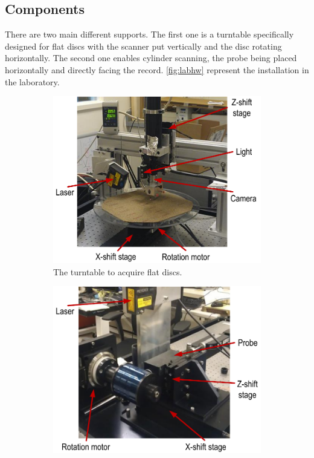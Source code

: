 \subsection{Components}

There are two main different supports. The first one is a turntable specifically designed for flat discs with the scanner put vertically and the disc rotating horizontally. The second one enables cylinder scanning, the probe being placed horizontally and directly facing the record. \autoref{fig:labhw} represent the installation in the laboratory.

\begin{figure}[!ht]
    \begin{subfigure}[b]{0.49\textwidth}
    \centering
    \includegraphics[width=\textwidth]{images/hardware-irene}
    \caption{The turntable to acquire flat discs.}
    \label{fig:labirene}
    \end{subfigure}
    \begin{subfigure}[b]{0.49\textwidth}
    \centering
    \includegraphics[width=\textwidth]{images/hardware-3d}

\end{subfigure}
\end{figure}
